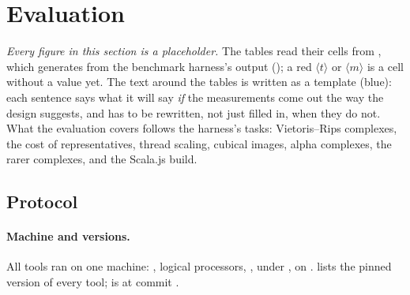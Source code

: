 \section{Evaluation}\label{sec:evaluation}

\emph{Every figure in this section is a placeholder.} The tables read their cells from , which
 generates from the benchmark harness's output (); a red $\langle t\rangle$ or
$\langle m\rangle$ is a cell without a value yet. The text around the tables is written as a template (blue): each
sentence says what it will say \emph{if} the measurements come out the way the design suggests, and has to be
rewritten, not just filled in, when they do not. What the evaluation covers follows the harness's tasks:
Vietoris--Rips complexes, the cost of representatives, thread scaling, cubical images, alpha complexes, the rarer
complexes, and the Scala.js build.

\subsection{Protocol}\label{sec:protocol}

\paragraph{Machine and versions.}
All tools ran on one machine: ,  logical processors, , under
, on . 
 lists the pinned version of every tool; \tdaj{} is at commit .

